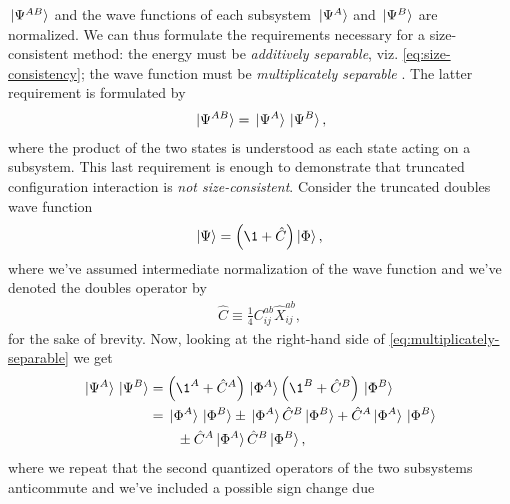             $\ket*{\Psi^{AB}}$ and the wave functions of each subsystem
            $\ket*{\Psi^{A}}$ and $\ket*{\Psi^{B}}$ are normalized.
            We can thus formulate the requirements necessary for a
            size-consistent method: the energy must be \emph{additively
            separable}, viz. \autoref{eq:size-consistency}; the wave function
            must be \emph{multiplicately separable} \cite{helgaker-molecular}.
            The latter requirement is formulated by
            \begin{align}
                \ket*{\Psi^{AB}}
                = \ket*{\Psi^{A}}\ket*{\Psi^{B}},
                \label{eq:multiplicately-separable}
            \end{align}
            where the product of the two states is understood as each state
            acting on a subsystem.
            This last requirement is enough to demonstrate that truncated
            configuration interaction is \emph{not size-consistent}.
            Consider the truncated doubles wave function
            \begin{align}
                \ket{\Psi} = \para{\1 + \hat{C}}\ket{\slat},
            \end{align}
            where we've assumed intermediate normalization of the wave function
            and we've denoted the doubles operator by
            \begin{align}
                \hat{C} \equiv \frac{1}{4}C^{ab}_{ij}\hat{X}^{ab}_{ij},
            \end{align}
            for the sake of brevity.
            Now, looking at the right-hand side of
            \autoref{eq:multiplicately-separable} we get
            \begin{align}
                \ket*{\Psi^{A}}\ket*{\Psi^{B}}
                &= \para{\1^{A} + \hat{C}^{A}}\ket*{\slat^A}
                \para{\1^{B} + \hat{C}^{B}}\ket*{\slat^B}
                \\
                &=
                \ket*{\slat^{A}}\ket*{\slat^{B}}
                \pm \ket*{\slat^{A}}\hat{C}^{B}\ket*{\slat^{B}}
                + \hat{C}^{A}\ket*{\slat^{A}}\ket*{\slat^{B}}
                \nonumber \\
                &\qquad
                \pm \hat{C}^{A}\ket*{\slat^{A}}\hat{C}^{B}\ket*{\slat^{B}},
            \end{align}
            where we repeat that the second quantized operators of the two
            subsystems anticommute and we've included a possible sign change due
